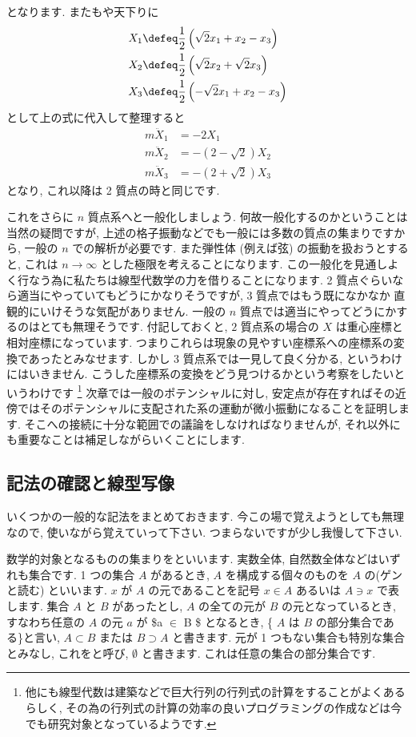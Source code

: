 \documentclass[openany, a4paper, oneside]{jsbook}
\begin{document}
となります. またもや天下りに
\begin{align}
X_1 &\defeq \frac{1}{2} \left ( \sqrt{2}x_1 + x_2 - x_3 \right) \\
X_2 &\defeq \frac{1}{2} \left ( \sqrt{2}x_2 + \sqrt{2}x_3 \right) \\
X_3 &\defeq \frac{1}{2} \left ( -\sqrt{2}x_1 + x_2 - x_3 \right)
\end{align}
として上の式に代入して整理すると
\begin{align}
m\ddot{X}_1 &= -2X_1 \\
m\ddot{X}_2 &= -(2 - \sqrt{2}) X_2 \\
m\ddot{X}_3 &= -(2 + \sqrt{2}) X_3
\end{align}
となり, これ以降は 2 質点の時と同じです.

これをさらに $n$ 質点系へと一般化しましょう. 何故一般化するのかということは当然の疑問ですが,
上述の格子振動などでも一般には多数の質点の集まりですから, 一般の $n$ での解析が必要です.
また弾性体 (例えば弦) の振動を扱おうとすると, これは $n\rightarrow \infty$ とした極限を考えることになります.
この一般化を見通しよく行なう為に私たちは線型代数学の力を借りることになります.
2 質点ぐらいなら適当にやっていてもどうにかなりそうですが, 3 質点ではもう既になかなか
直観的にいけそうな気配がありません. 一般の $n$ 質点では適当にやってどうにかするのはとても無理そうです.
付記しておくと,  $2$ 質点系の場合の $X$ は重心座標と相対座標になっています.
つまりこれらは現象の見やすい座標系への座標系の変換であったとみなせます.
しかし $3$ 質点系では一見して良く分かる, というわけにはいきません.
こうした座標系の変換をどう見つけるかという考察をしたいというわけです \footnote{他にも線型代数は建築などで巨大行列の行列式の計算をすることがよくあるらしく,
その為の行列式の計算の効率の良いプログラミングの作成などは今でも研究対象となっているようです.}
次章では一般のポテンシャルに対し,
安定点が存在すればその近傍ではそのポテンシャルに支配された系の運動が微小振動になることを証明します.
そこへの接続に十分な範囲での議論をしなければなりませんが, それ以外にも重要なことは補足しながらいくことにします.
\subsection{記法の確認と線型写像}

いくつかの一般的な記法をまとめておきます.
今この場で覚えようとしても無理なので, 使いながら覚えていって下さい.
つまらないですが少し我慢して下さい.

数学的対象となるものの集まりをといいます.
実数全体, 自然数全体などはいずれも集合です. 1 つの集合 $A$ があるとき,
 $A$ を構成する個々のものを $A$ の(ゲンと読む) といいます.
 $x$ が $A$ の元であることを記号 $x\in A$ あるいは $A\ni x$ で表します.
集合 $A$ と $B$ があったとし,  $A$ の全ての元が $B$ の元となっているとき, すなわち任意の $A$ の元 $a$ が \$a $\in$ B \$ となるとき,
\textgt\{ $A$ は $B$ の部分集合である\}と言い,  $A \subset B$ または $B\supset A$ と書きます.
元が 1 つもない集合も特別な集合とみなし, これをと呼び,  $\emptyset$ と書きます.
これは任意の集合の部分集合です.
\end{document}

